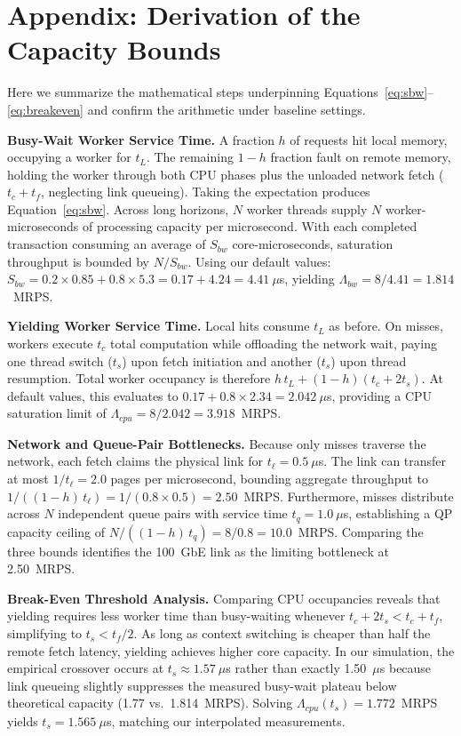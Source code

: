 \section*{Appendix: Derivation of the Capacity Bounds}
\label{sec:appendix}
Here we summarize the mathematical steps underpinning Equations~\eqref{eq:sbw}--\eqref{eq:breakeven} and confirm the arithmetic under baseline settings.

\textbf{Busy-Wait Worker Service Time.} A fraction $h$ of requests hit local memory, occupying a worker for $t_L$. The remaining $1-h$ fraction fault on remote memory, holding the worker through both CPU phases plus the unloaded network fetch ($t_c + t_f$, neglecting link queueing). Taking the expectation produces Equation~\eqref{eq:sbw}. Across long horizons, $N$ worker threads supply $N$ worker-microseconds of processing capacity per microsecond. With each completed transaction consuming an average of $S_{bw}$ core-microseconds, saturation throughput is bounded by $N/S_{bw}$. Using our default values: $S_{bw} = 0.2 \times 0.85 + 0.8 \times 5.3 = 0.17 + 4.24 = 4.41~\mu$s, yielding $\Lambda_{bw} = 8 / 4.41 = 1.814$~MRPS.

\textbf{Yielding Worker Service Time.} Local hits consume $t_L$ as before. On misses, workers execute $t_c$ total computation while offloading the network wait, paying one thread switch ($t_s$) upon fetch initiation and another ($t_s$) upon thread resumption. Total worker occupancy is therefore $h\,t_L + (1-h)(t_c + 2t_s)$. At default values, this evaluates to $0.17 + 0.8 \times 2.34 = 2.042~\mu$s, providing a CPU saturation limit of $\Lambda_{cpu} = 8 / 2.042 = 3.918$~MRPS.

\textbf{Network and Queue-Pair Bottlenecks.} Because only misses traverse the network, each fetch claims the physical link for $t_\ell = 0.5~\mu$s. The link can transfer at most $1/t_\ell = 2.0$ pages per microsecond, bounding aggregate throughput to $1 / ((1-h)\,t_\ell) = 1 / (0.8 \times 0.5) = 2.50$~MRPS. Furthermore, misses distribute across $N$ independent queue pairs with service time $t_q = 1.0~\mu$s, establishing a QP capacity ceiling of $N / ((1-h)\,t_q) = 8 / 0.8 = 10.0$~MRPS. Comparing the three bounds identifies the 100~GbE link as the limiting bottleneck at 2.50~MRPS.

\textbf{Break-Even Threshold Analysis.} Comparing CPU occupancies reveals that yielding requires less worker time than busy-waiting whenever $t_c + 2t_s < t_c + t_f$, simplifying to $t_s < t_f / 2$. As long as context switching is cheaper than half the remote fetch latency, yielding achieves higher core capacity. In our simulation, the empirical crossover occurs at $t_s \approx 1.57~\mu$s rather than exactly 1.50~$\mu$s because link queueing slightly suppresses the measured busy-wait plateau below theoretical capacity (1.77 vs.\ 1.814~MRPS). Solving $\Lambda_{cpu}(t_s) = 1.772$~MRPS yields $t_s = 1.565~\mu$s, matching our interpolated measurements.

